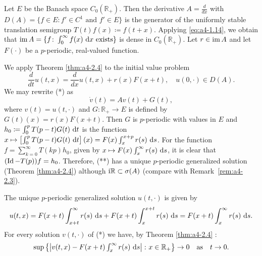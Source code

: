 \begin{example}\label{ex:a4-2.5}
Let $E$ be the Banach space $C_{0}(\mathbb{R}_{+})$. 
Then the derivative  $A = \frac{d}{dx}$ with $D(A) = \{f \in E: f' \in C^{1} \text{ and } f' \in E\}$ is the generator of the uniformly stable translation semigroup $T(t)f(x) \coloneqq f(t+x)$. 
Applying \eqref{eq:a4-1.14}, we obtain that $\mathop{}\!\mathrm{im}\, A = \{f\colon\int_{0}^{\infty} f(x) \,\mathop{}\!\mathrm{d}{x} \text{ exists}\}$ is dense in $C_{0}(\mathbb{R}_{+})$. 
Let $r \in \mathop{}\!\mathrm{im}\, A$ and let $F(\cdot)$ be a $p$-periodic, real-valued function.


We apply Theorem \ref{thm:a4-2.4}  to the initial value problem
\begin{equation}
 \frac{d}{dt} u(t,x) = \frac{d}{dx}u(t,x) + r(x)F(x+t), \quad u(0,\cdot) \in D(A). 
 \tag{*}
\end{equation}
We may rewrite (*) as
\begin{equation}
\dot{v}(t) = Av(t) + G(t), \tag{**}
\end{equation}
where $v(t) = u(t,\cdot)$ and $G\colon\mathbb{R}_{+} \to E$ is defined by $G(t)(x) = r(x)F(x+t)$.
Then $G$ is $p$-periodic with values in $E$ and $h_{0} \coloneqq \int_{0}^{p} T(p-t)G(t) \,\mathop{}\!\mathrm{d}{t}$ is the function $x \mapsto \left[\int_{0}^{p} T(p-t)G(t) \,\mathop{}\!\mathrm{d}{t}\right](x) = F(x)\int_{x}^{x+p} r(s) \,\mathop{}\!\mathrm{d}{s}$. 
For the function $f = \sum_{k=0}^{\infty} T(kp)h_{0}$, given by $x \mapsto F(x)\int_{x}^{\infty} r(s) \,\mathop{}\!\mathrm{d}{s}$, it is clear that $(\operatorname{Id} - T(p))f = h_{0}$. 
Therefore, (**) has a unique $p$-periodic generalized solution (Theorem \ref{thm:a4-2.4}) although $\mathrm{i} \mathbb{R} \subset \sigma(A)$ (compare with Remark~\ref{rem:a4-2.3}).


The unique $p$-periodic generalized solution $u(t,\cdot)$ is given by 
\[
u(t,x) = F(x+t)\int_{x+t}^{\infty} r(s)\,\mathop{}\!\mathrm{d}{s} + F(x+t)\int_{x}^{x+t} r(s)\,\mathop{}\!\mathrm{d}{s} = F(x+t)\int_{x}^{\infty} r(s)\,\mathop{}\!\mathrm{d}{s}.
\]
For every solution $v(t,\cdot)$ of (*) we have, by Theorem \ref{thm:a4-2.4} :
\[\textstyle 
\sup\left\{\left|v(t,x) - F(x+t)\int_{x}^{\infty} r(s) \,\mathop{}\!\mathrm{d}{s}\right| \colon x \in \mathbb{R}_{+}\right\} \to 0 \quad \text{as} \quad t \to 0.
\]
\end{example}


